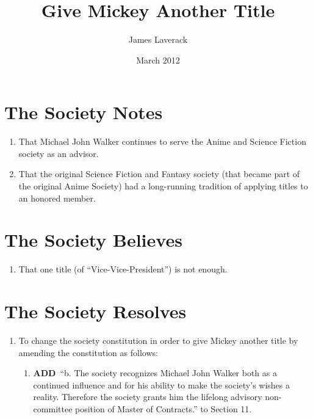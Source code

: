 \documentclass[a4paper,10pt]{article}
\title{Give Mickey Another Title}
\author{James Laverack}
\date{March 2012}
\newcommand{\add}{\textbf{ADD}\ }
\begin{document}
\maketitle

\section*{The Society Notes}
\begin{enumerate}
  \item That Michael John Walker continues to serve the Anime and Science Fiction society as an advisor.
  \item That the original Science Fiction and Fantasy society (that became part of the original Anime Society) had a long-running tradition of applying titles to an honored member.
\end{enumerate}

\section*{The Society Believes}
\begin{enumerate}
  \item That one title (of ``Vice-Vice-President'') is not enough.
\end{enumerate}

\section*{The Society Resolves}
\begin{enumerate}
  \item To change the society constitution in order to give Mickey another title by amending the constitution as follows:
  \begin{enumerate}
    \item \add ``b. The society recognizes Michael John Walker both as a continued influence and for his ability to make the society's wishes a reality. Therefore the society grants him the lifelong advisory non-committee position of Master of Contracts.'' to Section 11.
  \end{enumerate}
\end{enumerate}
\end{document}

